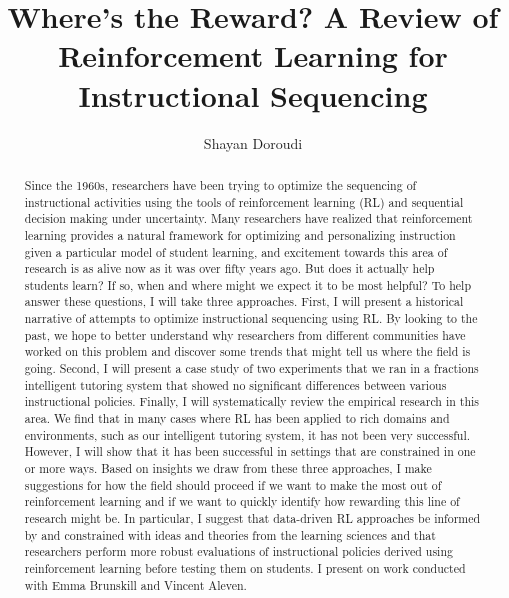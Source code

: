 \documentclass[runningheads]{llncs}
\begin{document}
%
\title{Where's the Reward? A Review of Reinforcement Learning for Instructional Sequencing}
%
%
\author{Shayan Doroudi}
%
%
%
\maketitle              %
%
\begin{abstract}
Since the 1960s, researchers have been trying to optimize the sequencing of instructional activities using the tools of reinforcement learning (RL) and sequential decision making under uncertainty. Many researchers have realized that reinforcement learning provides a natural framework for optimizing and personalizing instruction given a particular model of student learning, and excitement towards this area of research is as alive now as it was over fifty years ago. But does it actually help students learn? If so, when and where might we expect it to be most helpful? To help answer these questions, I will take three approaches. First, I will present a historical narrative of attempts to optimize instructional sequencing using RL. By looking to the past, we hope to better understand why researchers from different communities have worked on this problem and discover some trends that might tell us where the field is going. Second, I will present a case study of two experiments that we ran in a fractions intelligent tutoring system that showed no significant differences between various instructional policies. Finally, I will systematically review the empirical research in this area.  We find that in many cases where RL has been applied to rich domains and environments, such as our intelligent tutoring system, it has not been very successful. However, I will show that it has been successful in settings that are constrained in one or more ways. Based on insights we draw from these three approaches, I make suggestions for how the field should proceed if we want to make the most out of reinforcement learning and if we want to quickly identify how rewarding this line of research might be. In particular, I suggest that data-driven RL approaches be informed by and constrained with ideas and theories from the learning sciences and that researchers perform more robust evaluations of instructional policies derived using reinforcement learning before testing them on students. I present on work conducted with Emma Brunskill and Vincent Aleven.

\end{abstract}
%
%
%
\end{document}
